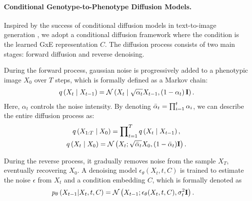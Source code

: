 \vspace{-3.5mm}
\paragraph{Conditional Genotype-to-Phenotype Diffusion Models.}
\label{sec:diffusion}
Inspired by the success of conditional diffusion models in text-to-image generation \cite{ho2020denoising, betker2023improving,saharia2022photorealistic,zhang2023adding}, we adopt a conditional diffusion framework where the condition is the learned GxE representation $C$. The diffusion process consists of two main stages: forward diffusion and reverse denoising\cite{ho2020denoising}.

During the forward process, gaussian noise is progressively added to a phenotypic image $X_0$ over $T$ steps, which is formally defined as a Markov chain:
\begin{align}
    q\left(X_{t} \mid X_{t-1}\right)=\mathcal{N}\left(X_{t} \mid \sqrt{\alpha_{t}} X_{t-1},\left(1-\alpha_{t}\right) \bf I\right).
\end{align}
Here, $\alpha_{t}$ controls the noise intensity. By denoting $\Bar{\alpha}_t = \prod\nolimits_{i=1}^{t} \alpha_i$, we can describe the entire diffusion process as:
\begin{gather}
    q\left( X_{1:T} \mid X_{0} \right) = \prod\nolimits_{t=1}^{T} q \left( X_t \mid X_{t-1} \right), \\
    q \left( X_t \mid X_{0} \right) = \mathcal{N} \left( X_t; \sqrt{\Bar{\alpha}_t} X_{0}, (1 - \Bar{\alpha}_t) \bf I \right).
\end{gather}


During the reverse process, it gradually removes noise from the sample $X_T$, eventually recovering $X_0$. A denoising model $\epsilon_{\theta} (X_t, t, C)$ is trained to estimate the noise $\epsilon$ from $X_t$ and a condition embedding $C$, %
which is formally denoted as 
\begin{align}
    p_{\theta} \left( X_{t-1} | X_{t}, t, C \right) &= \mathcal{N} \left( X_{t-1}; \epsilon_{\theta} (X_t, t, C), \sigma_{t}^{2} \bf I \right).
\end{align}


